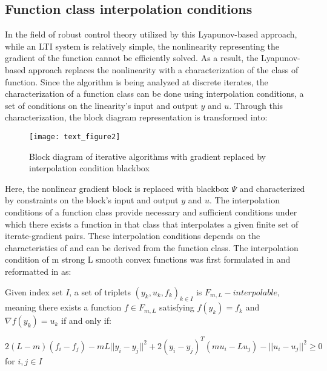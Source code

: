 \subsection*{Function class interpolation conditions}

In the field of robust control theory utilized by this Lyapunov-based approach, while an LTI system is relatively simple, the nonlinearity representing the gradient of the function cannot be efficiently solved. As a result, the Lyapunov-based approach replaces the nonlinearity with a characterization of the class of function. Since the algorithm is being analyzed at discrete iterates, the characterization of a function class can be done using interpolation conditions, a set of conditions on the linearity's input and output $y$ and $u$. Through this characterization, the block diagram representation is transformed into:
\begin{figure}[h]
    \centering
	\texttt{[image: text\_figure2]}
    \caption{Block diagram of iterative algorithms with gradient replaced by interpolation condition blackbox}
    \label{plot_block_diagram2}
\end{figure}
Here, the nonlinear gradient block is replaced with blackbox $\Psi$ and characterized by constraints on the block's input and output $y$ and $u$. The interpolation conditions of a function class provide necessary and sufficient conditions under which there exists a function in that class that interpolates a given finite set of iterate-gradient pairs. These interpolation conditions depends on the characteristics of and can be derived from the function class. The interpolation condition of m strong L smooth convex functions was first formulated in \cite{taylor2016} and reformatted in \cite{tutorial} as:

\begin{theorem}
	\label{thm:interpolation_condition}
	Given index set \(I\), a set of triplets \({(y_k, u_k, f_k)}_{k \in I}\) is \(F_{m,L}-interpolable\), meaning there exists a function \(f \in F_{m,L}\) satisfying \(f(y_k) = f_k\) and \(\nabla f(y_k) = u_k\) if and only if:

	\(2(L-m)(f_i - f_j) - mL||y_i - y_j||^2 + 2(y_i - y_j)^{T}(mu_i - Lu_j) - ||u_i - u_j||^2 \geq 0\) for \(i ,j \in I\)

\end{theorem}

